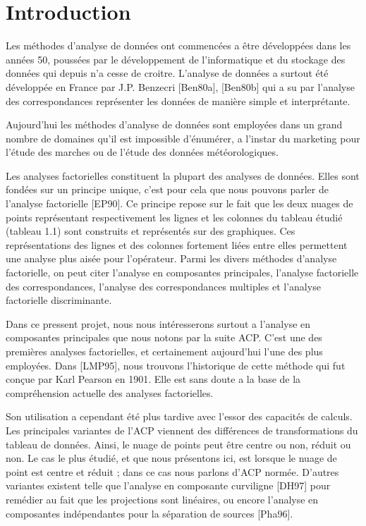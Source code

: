 \documentclass{article}
\begin{document}
\tableofcontents

\section{Introduction}

Les méthodes d'analyse de données ont commencées a être développées dans les années 50, poussées par le développement de l'informatique et du stockage des données qui depuis n'a cesse de croitre. L'analyse de données a surtout été développée en France par J.P. Benzecri [Ben80a], [Ben80b] qui a su par l'analyse des correspondances représenter les données de manière simple et interprétante.
\newline

Aujourd'hui les méthodes d'analyse de données sont employées dans un grand nombre de domaines qu'il est impossible d'énumérer, a l'instar du marketing pour l'étude des marches ou de l'étude des données météorologiques.
\newline

Les analyses factorielles constituent la plupart des analyses de données. Elles sont fondées sur un principe unique, c'est pour cela que nous pouvons parler de l'analyse factorielle [EP90]. Ce principe repose sur le fait que les deux nuages de points représentant respectivement les lignes et les colonnes du tableau étudié (tableau 1.1) sont construits et représentés sur des graphiques. Ces représentations des lignes et des colonnes fortement liées entre elles permettent une analyse plus aisée pour l'opérateur. Parmi les divers méthodes d'analyse factorielle, on peut citer l'analyse en composantes principales, l'analyse factorielle des correspondances, l'analyse des correspondances multiples et l'analyse factorielle discriminante.
\newline

Dans ce pressent projet, nous nous intéresserons surtout a l'analyse en composantes principales que nous notons par la suite ACP. C'est une des premières analyses factorielles, et certainement aujourd'hui l'une des plus employées. Dans [LMP95], nous trouvons l'historique de cette méthode qui fut conçue par Karl Pearson en 1901. Elle est sans doute a la base de la compréhension actuelle des analyses factorielles.
\newline

Son utilisation a cependant été plus tardive avec l'essor des capacités de calculs. Les principales variantes de l'ACP viennent des différences de transformations du tableau de données. Ainsi, le nuage de points peut être centre ou non, réduit ou non.
Le cas le plus étudié, et que nous présentons ici, est lorsque le nuage de point est centre et réduit ; dans ce cas nous parlons d'ACP normée. D'autres variantes existent telle que l'analyse en composante curviligne [DH97] pour remédier au fait que les projections sont linéaires, ou encore l'analyse en composantes indépendantes pour la séparation de sources [Pha96].
\end{document}
